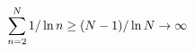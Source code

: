 \documentclass[preview]{standalone}
\begin{document}
\begin{align*}
\special{dvisvgm:raw <g id='unique000'>}\sum_{n=2}^N1/\ln n\ge(N-1)/\ln N\to\infty\special{dvisvgm:raw </g>}
\end{align*}
\end{document}
